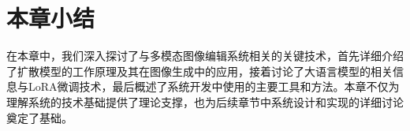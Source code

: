 \documentclass[a4paper,AutoFakeBold,oneside,12pt]{book}
\begin{document}
\section{本章小结}
在本章中，我们深入探讨了与多模态图像编辑系统相关的关键技术，首先详细介绍了扩散模型的工作原理及其在图像生成中的应用，接着讨论了大语言模型的相关信息与LoRA微调技术，最后概述了系统开发中使用的主要工具和方法。本章不仅为理解系统的技术基础提供了理论支撑，也为后续章节中系统设计和实现的详细讨论奠定了基础。






\end{document}

